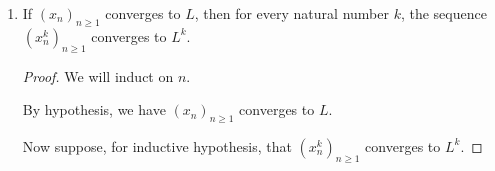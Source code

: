 \documentclass[12pt, letterpaper]{article}
\renewcommand{\epsilon}{\varepsilon}
\theoremstyle{definition} %
\begin{document}
\begin{enumerate}[label=\bfseries\arabic*.]
\begin{enumerate}[label=\bfseries(\alph*)]
    \item If $(x_n)_{n \geq 1}$ converges to a number $L>0$, then there is an 
    $N$ such that $x_n > 0$ for every $n \geq N$.

    \begin{proof} ~\\
        If $(x_n)_{n \geq 1}$ converges to $L>0$, then by (2b), for all 
        $\epsilon > 0$, there is an $N$ such that for all $n \geq N$: 
        \begin{equation*}
            L-\epsilon < x_n < L+\epsilon
        \end{equation*}

        We have $L>0$, so take $\epsilon = L$. Then
        \begin{align*}
            L-\epsilon < x_n &\implies L-L < x_n \\
                             &\implies 0 < x_n
        \end{align*}

        And so we have $0<x_n$ for every $n \geq N$.
    \end{proof}

    \item
    \begin{proof} ~\\
    \end{proof}
    \item
    \begin{proof} ~\\
    \end{proof}
\end{enumerate}

\item If $(x_n)_{n \geq 1}$ converges to $L$, then for every natural
number $k$, the sequence $(x_n^k)_{n \geq 1}$ converges to $L^k$.

\begin{proof}
    We will induct on $n$.

    By hypothesis, we have $(x_n)_{n \geq 1}$ converges to $L$.

    Now suppose, for inductive hypothesis, that $(x_n^k)_{n \geq 1}$ converges 
    to $L^k$.


\end{proof}
\end{enumerate}
\end{document}
